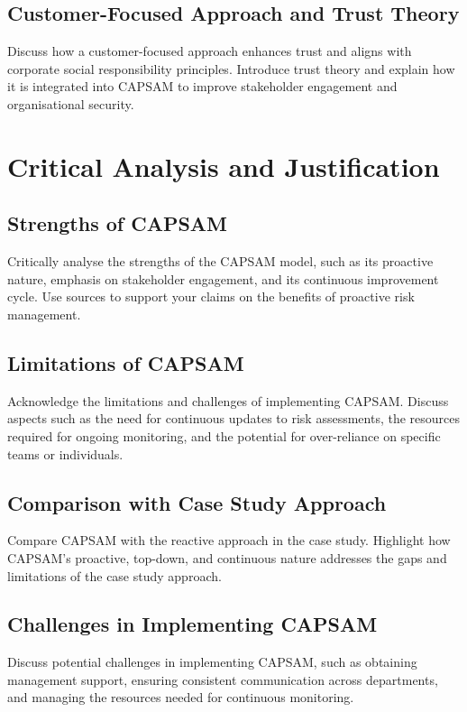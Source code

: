     \subsection{Customer-Focused Approach and Trust Theory}
    Discuss how a customer-focused approach enhances trust and aligns with corporate social responsibility principles. Introduce trust theory and explain how it is integrated into CAPSAM to improve stakeholder engagement and organisational security.

\section{Critical Analysis and Justification}
    \subsection{Strengths of CAPSAM}
    Critically analyse the strengths of the CAPSAM model, such as its proactive nature, emphasis on stakeholder engagement, and its continuous improvement cycle. Use sources to support your claims on the benefits of proactive risk management.

    \subsection{Limitations of CAPSAM}
    Acknowledge the limitations and challenges of implementing CAPSAM. Discuss aspects such as the need for continuous updates to risk assessments, the resources required for ongoing monitoring, and the potential for over-reliance on specific teams or individuals.

    \subsection{Comparison with Case Study Approach}
    Compare CAPSAM with the reactive approach in the case study. Highlight how CAPSAM’s proactive, top-down, and continuous nature addresses the gaps and limitations of the case study approach.

    \subsection{Challenges in Implementing CAPSAM}
    Discuss potential challenges in implementing CAPSAM, such as obtaining management support, ensuring consistent communication across departments, and managing the resources needed for continuous monitoring.

